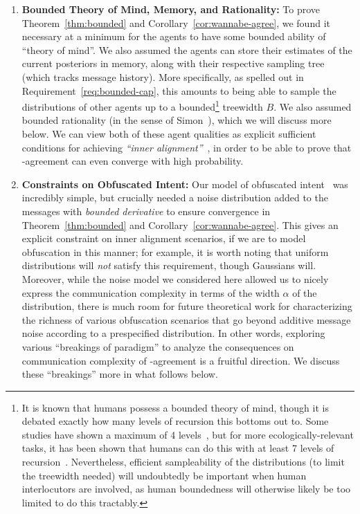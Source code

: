 \begin{enumerate}
\item \textbf{Bounded Theory of Mind, Memory, and Rationality:} To prove Theorem~\ref{thm:bounded} and Corollary~\ref{cor:wannabe-agree}, we found it necessary at a minimum for the agents to have some bounded ability of ``theory of mind''.
We also assumed the agents can store their estimates of the current posteriors in memory, along with their respective sampling tree (which tracks message history).
More specifically, as spelled out in Requirement~\ref{req:bounded-cap}, this amounts to being able to sample the distributions of other agents up to a bounded\footnote{It is known that humans possess a bounded theory of mind, though it is debated exactly how many levels of recursion this bottoms out to. Some studies have shown a maximum of 4 levels~\citep{kinderman1998theory}, but for more ecologically-relevant tasks, it has been shown that humans can do this with at least 7 levels of recursion~\citep{o2015ease}. Nevertheless, efficient sampleability of the distributions (to limit the treewidth needed) will undoubtedly be important when human interlocutors are involved, as human boundedness will otherwise likely be too limited to do this tractably.} treewidth $B$.
We also assumed bounded rationality (in the sense of Simon~\citep{simon1984models}), which we will discuss more below.
We can view both of these agent qualities as explicit sufficient conditions for achieving \emph{``inner alignment''}~\citep{ngo2022alignment}, in order to be able to prove that \agree-agreement can even converge with high probability.

\item \textbf{Constraints on Obfuscated Intent:} Our model of obfuscated intent~\citep{barnes2020debateobf} was incredibly simple, but crucially needed a noise distribution added to the messages with \emph{bounded derivative} to ensure convergence in Theorem~\ref{thm:bounded} and Corollary~\ref{cor:wannabe-agree}.
This gives an explicit constraint on inner alignment scenarios, if we are to model obfuscation in this manner; for example, it is worth noting that uniform distributions will \emph{not} satisfy this requirement, though Gaussians will.
Moreover, while the noise model we considered here allowed us to nicely express the communication complexity in terms of the width $\alpha$ of the distribution, there is much room for future theoretical work for characterizing the richness of various obfuscation scenarios that go beyond additive message noise according to a prespecified distribution.
In other words, exploring various ``breakings of paradigm'' to analyze the consequences on communication complexity of \agree-agreement is a fruitful direction.
We discuss these ``breakings'' more in what follows below.
\end{enumerate}

